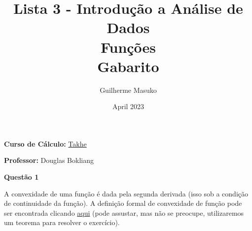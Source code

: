 \documentclass[12pt, a4paper]{article}
\title{Lista 3 - Introdução a Análise de Dados \\
	Funções\\
	Gabarito}
\author{Guilherme Masuko}
\date{April 2023}
\begin{document}
	
\clearpage
\maketitle
\thispagestyle{empty}

\textbf{Curso de Cálculo:} \href{https://cursos.takhe.com.br/}{Takhe}

\textbf{Professor:} Douglas Bokliang

\vspace{1cm}



\textbf{Questão 1}

A convexidade de uma função é dada pela segunda derivada (isso sob a condição de continuidade da função). A definição formal de convexidade de função pode ser encontrada clicando \href{https://pt.wikipedia.org/wiki/Fun\%C3\%A7\%C3\%A3o\_convexa}{aqui} (pode assustar, mas não se preocupe, utilizaremos um teorema para resolver o exercício).
\end{document}
